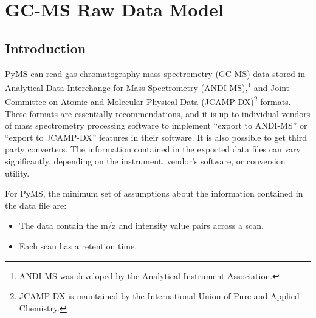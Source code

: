 

\chapter{GC-MS Raw Data Model}

\section{\label{sec:chapter2-introduction}Introduction}

PyMS can read gas chromatography-mass spectrometry (GC-MS) data stored in
Analytical Data Interchange for Mass Spectrometry (ANDI-MS),\footnote{ANDI-MS
was developed by the Analytical Instrument Association.} and Joint Committee on
Atomic and Molecular Physical Data (JCAMP-DX)\footnote{JCAMP-DX is maintained by
the International Union of Pure and Applied Chemistry.} formats. These formats
are essentially recommendations, and it is up to individual vendors of mass
spectrometry processing software to implement ``export to ANDI-MS'' or ``export
to JCAMP-DX'' features in their software. It is also possible to get third party
converters. The information contained in the exported data files
can vary significantly, depending on the instrument, vendor's software, or
conversion utility.

For PyMS, the minimum set of assumptions about the information contained in the
data file are:

\begin{itemize}
 \item The data contain the m/z and intensity value pairs across a scan.
 \item Each scan has a retention time.
\end{itemize}

